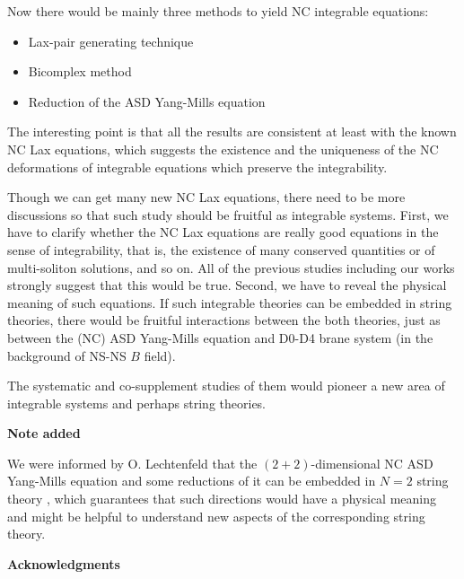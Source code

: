 \documentclass[a4paper,12pt]{article}\setlength{\topmargin}{-1cm}
\begin{document}
Now there would be mainly three methods to yield NC integrable
equations:
\begin{itemize}
\item Lax-pair generating technique
\item Bicomplex method
\item Reduction of the ASD Yang-Mills equation
\end{itemize}
The interesting point is that 
all the results are consistent
at least with the known NC Lax equations, 
which suggests the existence and 
the uniqueness of the NC deformations of integrable equations
which preserve the integrability.

Though we can get many new NC Lax equations,
there need to be more discussions so that
such study should be fruitful as integrable systems.
First, we have to clarify whether the NC Lax equations
are really good equations in the sense of integrability, that is,
the existence of many conserved quantities or
of multi-soliton solutions, and so on.
All of the previous studies including our works
strongly suggest that this would be true.
Second, we have to reveal the physical meaning of such equations.
If such integrable theories can be embedded in string
theories, there would be fruitful interactions
between the both theories,
just as between the (NC) ASD Yang-Mills equation and
D0-D4 brane system (in the background of NS-NS $B$ field).

The systematic and co-supplement studies of them would
pioneer a new area of integrable systems and 
perhaps string theories.

\vskip5mm\noindent
{\bf Note added}
\vskip2mm

\noindent
We were informed by O. Lechtenfeld 
that the $(2+2)$-dimensional NC ASD Yang-Mills equation and
some reductions of it can be embedded \cite{LPS, LePo}
in $N=2$ string theory \cite{OoVa},
which guarantees that such directions would have a physical
meaning and might be helpful to understand new aspects of 
the corresponding string theory.

\vskip7mm\noindent
{\bf Acknowledgments}
\vskip2mm
\end{document}
